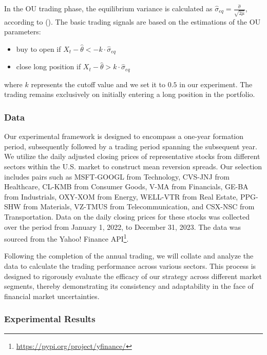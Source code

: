 \documentclass{article}
\begin{document}
In the OU trading phase, the equilibrium variance is calculated as \(\hat{\sigma}_{eq} = \frac{\hat{\sigma}}{\sqrt{2\hat{\mu}}}\), according to \citeauthor{avellaneda2010statistical} (\citeyear{avellaneda2010statistical}). The basic trading signals are based on the estimations of the OU parameters: 
\begin{itemize}
    \item buy to open if \(X_t - \hat{\theta} < -k\cdot \hat{\sigma}_{eq}\)
    \item close long position if \(X_t - \hat{\theta} > k\cdot \hat{\sigma}_{eq}\)
\end{itemize}
where \(k\) represents the cutoff value and we set it to \(0.5\) in our experiment. The trading remains exclusively on initially entering a long position in the portfolio.

\subsubsection{Data}
Our experimental framework is designed to encompass a one-year formation period, subsequently followed by a trading period spanning the subsequent year. We utilize the daily adjusted closing prices of representative stocks from different sectors within the U.S. market to construct mean reversion spreads. Our selection includes pairs such as MSFT-GOOGL from Technology, CVS-JNJ from Healthcare, CL-KMB from Consumer Goods, V-MA from Financials, GE-BA from Industrials, OXY-XOM from Energy, WELL-VTR from Real Estate, PPG-SHW from Materials, VZ-TMUS from Telecommunication, and CSX-NSC from Transportation. Data on the daily closing prices for these stocks was collected over the period from January 1, 2022, to December 31, 2023. The data was sourced from the Yahoo! Finance API\footnote{\url{https://pypi.org/project/yfinance/}}.
   
Following the completion of the annual trading, we will collate and analyze the data to calculate the trading performance across various sectors. This process is designed to rigorously evaluate the efficacy of our strategy across different market segments, thereby demonstrating its consistency and adaptability in the face of financial market uncertainties. 

\subsubsection{Experimental Results}
\end{document}
